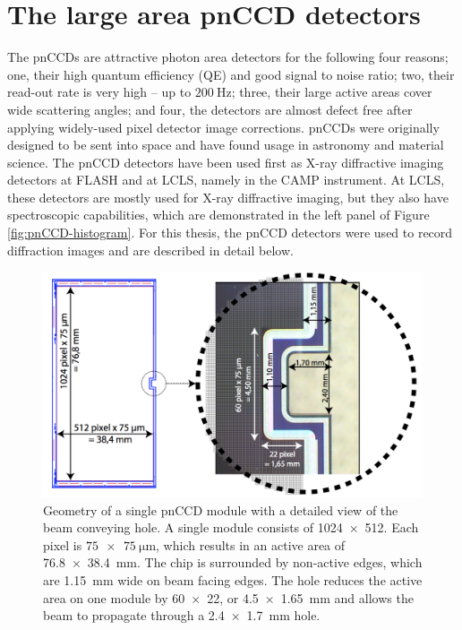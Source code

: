 \section{The large area pnCCD detectors}\label{sec:pnCCD}
The pnCCDs are attractive photon area detectors for the following four reasons; one, their high quantum efficiency (QE) and good signal to noise ratio; two, their read-out rate is very high -- up to $\SI{200}{\hertz}$; three, their large active areas cover wide scattering angles; and four, the detectors are almost defect free after applying widely-used pixel detector image corrections. pnCCDs were originally designed to be sent into space and have found usage in astronomy and material science. The pnCCD detectors have been used first as X-ray diffractive imaging detectors at FLASH and at LCLS, namely in the CAMP instrument. At LCLS, these detectors are mostly used for X-ray diffractive imaging, but they also have spectroscopic capabilities, which are demonstrated in the left panel of Figure \ref{fig:pnCCD-histogram}. For this thesis, the pnCCD detectors were used to record diffraction images and are described in detail below.\\[1\baselineskip]
%
\begin{figure}
   \includegraphics[width=0.7\linewidth]{images/pnCCD-detail.png}
    \caption[Geometry of a single pnCCD module.]{Geometry of a single pnCCD module with a detailed view of the beam conveying hole. A single module consists of \SI{1024 x 512}{\pixels}. Each pixel is $\SI{75 x 75}{\micro\meter}$, which results in an active area of \SI{76.8 x 38.4}{\milli\meter}. The chip is surrounded by non-active edges, which are \SI{1.15}{\milli\meter} wide on beam facing edges. The hole reduces the active area on one module by \SI{60 x 22}{\pixels}, or \SI{4.5 x 1.65}{\milli\meter} and allows the beam to propagate through a \SI{2.4 x 1.7}{\milli\meter} hole.}
\label{fig:ccd-detail}
\end{figure}
